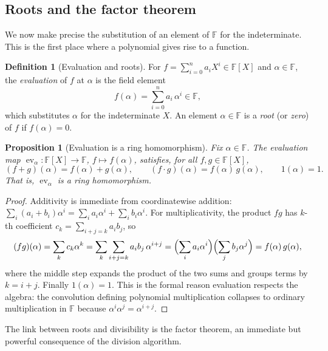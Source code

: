 \documentclass[11pt,a4paper]{article}
\newtheorem{proposition}[theorem]{Proposition}
\theoremstyle{definition}
\newtheorem{definition}[theorem]{Definition}
\theoremstyle{remark}
\newcommand{\F}{\ensuremath{\mathbb{F}}}
\begin{document}
\subsection{Roots and the factor theorem}
\label{polynomials:subsec:roots}

We now make precise the substitution of an element of \(\F\) for the
indeterminate. This is the first place where a polynomial gives rise to a
function.

\begin{definition}[Evaluation and roots]\label{polynomials:def:evaluation}
For \(f = \sum_{i=0}^n a_i X^i \in \F[X]\) and \(\alpha \in \F\), the
\emph{evaluation} of \(f\) at \(\alpha\) is the field element
\[
  f(\alpha) = \sum_{i=0}^n a_i\, \alpha^i \in \F,
\]
which substitutes \(\alpha\) for the indeterminate \(X\). An element
\(\alpha \in \F\) is a \emph{root} (or \emph{zero}) of \(f\) if
\(f(\alpha) = 0\).
\end{definition}

\begin{proposition}[Evaluation is a ring homomorphism]\label{polynomials:prop:eval-hom}
Fix \(\alpha \in \F\). The \emph{evaluation map}
\(\operatorname{ev}_\alpha \colon \F[X] \to \F\), \(f \mapsto f(\alpha)\),
satisfies, for all \(f, g \in \F[X]\),
\[
  (f + g)(\alpha) = f(\alpha) + g(\alpha),
  \qquad
  (f \cdot g)(\alpha) = f(\alpha)\, g(\alpha),
  \qquad
  1(\alpha) = 1.
\]
That is, \(\operatorname{ev}_\alpha\) is a ring homomorphism.
\end{proposition}

\begin{proof}
Additivity is immediate from coordinatewise addition:
\(\sum_i (a_i + b_i)\alpha^i = \sum_i a_i \alpha^i + \sum_i b_i \alpha^i\). For
multiplicativity, the product \(fg\) has \(k\)-th coefficient
\(c_k = \sum_{i+j=k} a_i b_j\), so
\[
  (fg)(\alpha) = \sum_k c_k \alpha^k
    = \sum_k \sum_{i+j=k} a_i b_j\, \alpha^{i+j}
    = \Bigl(\sum_i a_i \alpha^i\Bigr)\Bigl(\sum_j b_j \alpha^j\Bigr)
    = f(\alpha)\, g(\alpha),
\]
where the middle step expands the product of the two sums and groups terms by
\(k = i + j\). Finally \(1(\alpha) = 1\). This is the formal reason evaluation
respects the algebra: the convolution defining polynomial multiplication
collapses to ordinary multiplication in \(\F\) because \(\alpha^i \alpha^j =
\alpha^{i+j}\).
\end{proof}

The link between roots and divisibility is the factor theorem, an immediate but
powerful consequence of the division algorithm.
\end{document}
